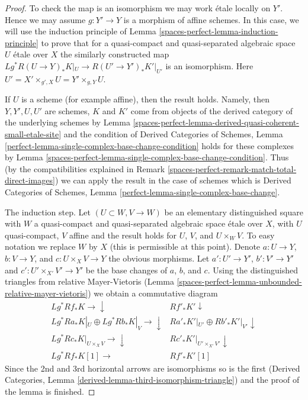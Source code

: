 \begin{proof}
To check the map is an isomorphism we may work \'etale locally on $Y'$.
Hence we may assume $g : Y' \to Y$ is a morphism of affine schemes.
In this case, we will use the induction principle of
Lemma \ref{spaces-perfect-lemma-induction-principle}
to prove that for a quasi-compact and quasi-separated
algebraic space $U$ \'etale over $X$
the similarly constructed map
$Lg^*R(U \to Y)_*K|_U \to R(U' \to Y')_*K'|_{U'}$
is an isomorphism. Here $U' = X' \times_{g', X} U = Y' \times_{g, Y} U$.

\medskip\noindent
If $U$ is a scheme (for example affine), then the result holds.
Namely, then $Y, Y', U, U'$ are schemes, $K$ and $K'$ come from
objects of the derived category of the underlying schemes by
Lemma \ref{spaces-perfect-lemma-derived-quasi-coherent-small-etale-site}
and the condition of
Derived Categories of Schemes,
Lemma \ref{perfect-lemma-single-complex-base-change-condition}
holds for these complexes by
Lemma \ref{spaces-perfect-lemma-single-complex-base-change-condition}.
Thus (by the compatibilities explained in
Remark \ref{spaces-perfect-remark-match-total-direct-images})
we can apply the result in the case of schemes
which is
Derived Categories of Schemes, Lemma
\ref{perfect-lemma-single-complex-base-change}.

\medskip\noindent
The induction step. Let $(U \subset W, V \to W)$ be an elementary
distinguished square with $W$ a quasi-compact and quasi-separated
algebraic space \'etale over $X$, with $U$ quasi-compact, $V$ affine
and the result holds for $U$, $V$, and $U \times_W V$.
To easy notation we replace $W$ by $X$ (this is permissible at this point).
Denote $a : U \to Y$, $b : V \to Y$, and $c : U \times_X V \to Y$
the obvious morphisms. Let $a' : U' \to Y'$, $b' : V' \to Y'$
and $c' : U' \times_{X'} V' \to Y'$ be the base changes of $a$, $b$, and $c$.
Using the distinguished triangles from relative Mayer-Vietoris
(Lemma \ref{spaces-perfect-lemma-unbounded-relative-mayer-vietoris})
we obtain a commutative diagram
$$
\begin{array}{cc}Lg^*Rf_*K \longrightarrow\downarrow & Rf'_*K' \downarrow \\ Lg^*Ra_*K|_U \oplus Lg^*Rb_*K|_V \longrightarrow\downarrow & Ra'_* K'|_{U'} \oplus Rb'_* K'|_{V'} \downarrow \\ Lg^*Rc_*K|_{U \times_X V} \longrightarrow\downarrow & Rc'_*K'|_{U' \times_{X'} V'} \downarrow \\ Lg^*Rf_* K[1] \longrightarrow & Rf'_* K'[1]\end{array}
$$
Since the 2nd and 3rd horizontal arrows are isomorphisms so is the first
(Derived Categories, Lemma \ref{derived-lemma-third-isomorphism-triangle})
and the proof of the lemma is finished.
\end{proof}

